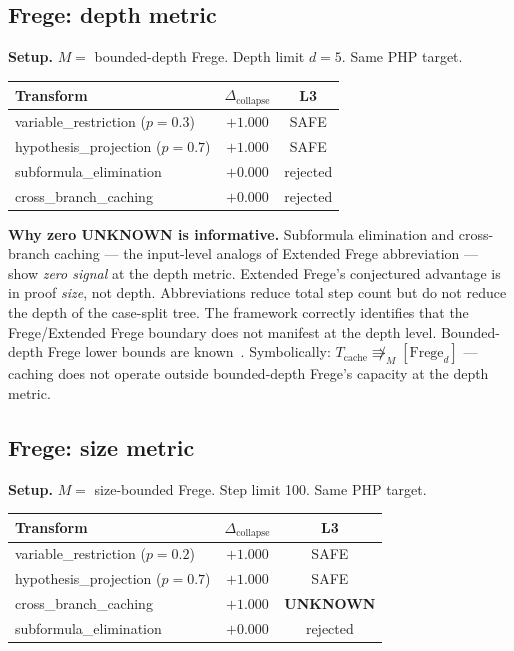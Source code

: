 \documentclass[11pt,a4paper]{article}
\newcommand{\extop}{\Rrightarrow_M}           %
\newcommand{\Dcollapse}{\Delta_{\mathrm{collapse}}}
\newcommand{\PHP}{\mathrm{PHP}}
\begin{document}
\subsection{Frege: depth metric}

\textbf{Setup.} $M = $ bounded-depth Frege. Depth limit $d = 5$. Same $\PHP$ target.

\begin{center}
\begin{tabular}{@{}lcc@{}}
\toprule
Transform & $\Dcollapse$ & L3 \\
\midrule
variable\_restriction ($p=0.3$) & $+1.000$ & SAFE \\
hypothesis\_projection ($p=0.7$) & $+1.000$ & SAFE \\
subformula\_elimination & $+0.000$ & rejected \\
cross\_branch\_caching & $+0.000$ & rejected \\
\bottomrule
\end{tabular}
\end{center}

\textbf{Why zero UNKNOWN is informative.} Subformula elimination and cross-branch caching --- the input-level analogs of Extended Frege abbreviation --- show \emph{zero signal} at the depth metric. Extended Frege's conjectured advantage is in proof \emph{size}, not depth. Abbreviations reduce total step count but do not reduce the depth of the case-split tree. The framework correctly identifies that the Frege/Extended Frege boundary does not manifest at the depth level. Bounded-depth Frege lower bounds are known~\cite{KrajicekPudlak1995}. Symbolically: $T_{\mathrm{cache}} \not\extop[\mathrm{Frege}_d]$ --- caching does not operate outside bounded-depth Frege's capacity at the depth metric.

\subsection{Frege: size metric}

\textbf{Setup.} $M = $ size-bounded Frege. Step limit 100. Same $\PHP$ target.

\begin{center}
\begin{tabular}{@{}lcc@{}}
\toprule
Transform & $\Dcollapse$ & L3 \\
\midrule
variable\_restriction ($p=0.2$) & $+1.000$ & SAFE \\
hypothesis\_projection ($p=0.7$) & $+1.000$ & SAFE \\
cross\_branch\_caching & $+1.000$ & \textbf{UNKNOWN} \\
subformula\_elimination & $+0.000$ & rejected \\
\bottomrule
\end{tabular}
\end{center}
\end{document}
